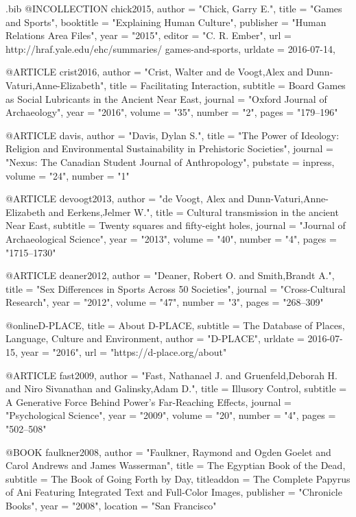 \begin{filecontents}{\IJSRAidentifier.bib}
@INCOLLECTION {chick2015,
	author  = "Chick, Garry E.",
	title     = "Games and Sports",
	booktitle = "Explaining Human Culture",
	publisher = "Human Relations Area Files",
	year      = "2015",
	editor    = "C. R. Ember",
	url     = {http://hraf.yale.edu/ehc/summaries/ games-and-sports},
	urldate = {2016-07-14},
}

@ARTICLE {crist2016,
	author  = "Crist, Walter and de Voogt,Alex  and Dunn-Vaturi,Anne-Elizabeth",
	title   = {Facilitating Interaction},
	subtitle = {Board Games as Social Lubricants in the Ancient Near East},
	journal = "Oxford Journal of Archaeology",
	year    = "2016",
	volume  = "35",
	number  = "2",
	pages   = "179--196"
}

@ARTICLE {davis,
	author  = "Davis, Dylan S.",
	title   = "The Power of Ideology: Religion and Environmental Sustainability in Prehistoric Societies",
	journal = "Nexus: The Canadian Student Journal of Anthropology",
	pubstate    = {inpress},
	volume  = "24",
	number  = "1"
}

@ARTICLE {devoogt2013,
	author  = "de Voogt, Alex and  Dunn-Vaturi,Anne-Elizabeth and Eerkens,Jelmer W.",
	title   = {Cultural transmission in the ancient Near East},
	subtitle = {Twenty squares and fifty-eight holes},
	journal = "Journal of Archaeological Science",
	year    = "2013",
	volume  = "40",
	number  = "4",
	pages   = "1715--1730"
}

@ARTICLE {deaner2012,
	author  = "Deaner, Robert O. and Smith,Brandt A.",
	title   = "Sex Differences in Sports Across 50 Societies",
	journal = "Cross-Cultural Research",
	year    = "2012",
	volume  = "47",
	number  = "3",
	pages   = "268--309"
}

@online{D-PLACE,
	title    = {About D-PLACE},
	subtitle = {The Database of Places, Language, Culture and Environment},
	author   = "{D-PLACE}",
	urldate = {2016-07-15},
	year     = "2016",
	url      = "https://d-place.org/about"
}

@ARTICLE {fast2009,
	author  = "Fast, Nathanael J. and   Gruenfeld,Deborah H. and Niro Sivanathan and Galinsky,Adam D.",
	title   = {Illusory Control},
	subtitle = {A Generative Force Behind Power's Far-Reaching Effects},
	journal = "Psychological Science",
	year    = "2009",
	volume  = "20",
	number  = "4",
	pages   = "502--508"
}

@BOOK {faulkner2008,
	author    = "Faulkner, Raymond and Ogden Goelet and Carol Andrews and James Wasserman",
	title     = {The Egyptian Book of the Dead},
	subtitle = {The Book of Going Forth by Day},
	titleaddon = {The Complete Papyrus of Ani Featuring Integrated Text and Full-Color Images},
	publisher = "Chronicle Books",
	year      = "2008",
	location   = "San Francisco"
}


\end{filecontents}
